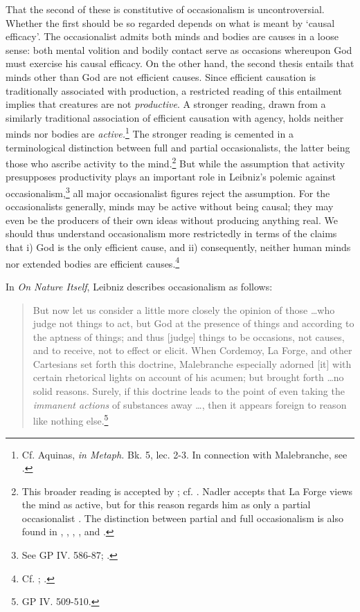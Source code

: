 \documentclass[]{article}
\begin{document}
That the second of these is constitutive of occasionalism is uncontroversial. Whether the first should be so regarded depends on what is meant by `causal efficacy'. The occasionalist admits both minds and bodies are causes in a loose sense: both mental volition and bodily contact serve as occasions whereupon God must exercise his causal efficacy. On the other hand, the second thesis entails that minds other than God are not efficient causes. Since efficient causation is traditionally associated with production, a restricted reading of this entailment implies that creatures are not \emph{productive}. A stronger reading, drawn from a similarly traditional association of efficient causation with agency, holds neither minds nor bodies are \emph{active.}\footnote{Cf. Aquinas, \emph{in Metaph.} Bk. 5, lec. 2-3. In connection with Malebranche, see \autocite[255-256]{Baker2005}.} The stronger reading is cemented in a terminological distinction between full and partial occasionalists, the latter being those who ascribe activity to the mind.\footnote{This broader reading is accepted by \autocite{Nadler2005}; cf. \autocite[288]{Winkler2011}. Nadler accepts that La Forge views the mind as active, but for this reason regards him as only a partial occasionalist \autocite[227]{Nadler1998}. The distinction between partial and full occasionalism is also found in \autocite{Radner1993}, \autocite{Garber1987}, \autocite{Clarke2000}, \autocite{Bardout2002}, and \autocite{Kolesnik2006}.} But while the assumption that activity presupposes productivity plays an important role in Leibniz's polemic against occasionalism,\footnote{See GP IV. 586-87; \autocite{Rutherford1993}.} all major occasionalist figures reject the assumption. For the occasionalists generally, minds may be active without being causal; they may even be the producers of their own ideas without producing anything real. We should thus understand occasionalism more restrictedly in terms of the claims that i) God is the only efficient cause, and ii) consequently, neither human minds nor extended bodies are efficient causes.\footnote{Cf. \autocite[625-626]{Platt2011}; \autocite[101]{Gouhier1926}.}

In \emph{On Nature Itself}, Leibniz describes occasionalism as follows:

\begin{quote}
	But now let us consider a little more closely the opinion of those \ldots who judge not things to act, but God at the presence of things and according to the aptness of things; and thus [judge] things to be occasions, not causes, and to receive, not to effect or elicit. When Cordemoy, La Forge, and other Cartesians set forth this doctrine, Malebranche especially adorned {[}it{]} with certain rhetorical lights on account of his acumen; but brought forth \ldots no solid reasons. Surely, if this doctrine leads to the point of even taking the \emph{immanent actions} of substances away \ldots, then it appears foreign to reason like nothing else.\footnote{GP IV. 509-510.}
\end{quote}
\end{document}
